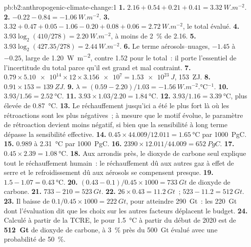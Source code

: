 \begin{solution}{pb:b2:anthropogenic-climate-change:1}
\textbf{1.} $2.16 + 0.54 + 0.21 + 0.41 = \qty{3.32}{W.m^{-2}}$.
\textbf{2.} $-0.22 - 0.84 = \qty{-1.06}{W.m^{-2}}$.
\textbf{3.} $3.32 + 0.47 + 0.05 - 1.06 - 0.20 + 0.08 + 0.06 = \qty{2.72}{W.m^{-2}}$, le total
évalué.
\textbf{4.} $3.93\log_2(410/278) = \qty{2.20}{W.m^{-2}}$, à moins de \qty{2}{\percent} de 2.16.
\textbf{5.} $3.93\log_2(427.35/278) = \qty{2.44}{W.m^{-2}}$.
\textbf{6.} Le terme aérosols--nuages, $-1.45$ à $-0.25$, large de \qty{1.20}{W.m^{-2}}, contre 1.52 pour
le total~: il porte l'essentiel de l'incertitude du total parce qu'il est grand
et mal contraint.
\textbf{7.} $0.79 \times \num{5.10e14} \times 12 \times \num{3.156e7} = \qty{1.53e23}{J}$,
\qty{153}{ZJ}.
\textbf{8.} $0.91 \times 153 = \qty{139}{ZJ}$.
\textbf{9.} $\lambda = (0.59 - 2.20)/1.03 = \qty{-1.56}{W.m^{-2}.\celsius^{-1}}$.
\textbf{10.} $3.93/1.56 = \qty{2.52}{\celsius}$.
\textbf{11.} $3.93 \times 1.03/2.20 = \qty{1.84}{\celsius}$.
\textbf{12.} $3.93/1.16 = \qty{3.39}{\celsius}$, plus élevée de \qty{0.87}{\celsius}.
\textbf{13.} Le réchauffement jusqu'ici a été le plus fort là où les rétroactions sont les plus négatives~; à mesure que le motif évolue,
le paramètre de rétroaction devient moins négatif, si bien que la sensibilité à long terme
dépasse la sensibilité effective.
\textbf{14.} $0.45 \times 44.009/12.011 = \qty{1.65}{\celsius}$ par \qty{1000}{PgC}.
\textbf{15.} 0.989 à \qty{2.31}{\celsius} par \qty{1000}{PgC}.
\textbf{16.} $2390 \times 12.011/44.009 = \qty{652}{PgC}$.
\textbf{17.} $0.45 \times 2.39 = \qty{1.08}{\celsius}$.
\textbf{18.} Aux arrondis près, le dioxyde de carbone seul explique tout le réchauffement humain~:
le réchauffement dû aux autres gaz à effet de serre et le refroidissement dû aux aérosols se compensent presque.
\textbf{19.} $1.5 - 1.07 = \qty{0.43}{\celsius}$.
\textbf{20.} $(0.43 - 0.1)/0.45 \times 1000 = \qty{733}{Gt}$ de dioxyde de carbone.
\textbf{21.} $733 - 210 = \qty{523}{Gt}$.
\textbf{22.} $26 \times 0.43 = \qty{11.2}{Gt}$~; $523 - 11.2 = \qty{512}{Gt}$.
\textbf{23.} Il baisse de $0.1/0.45 \times 1000 = \qty{222}{Gt}$, pour atteindre \qty{290}{Gt}~: les
\qty{220}{Gt} dont l'évaluation dit que les choix sur les autres facteurs déplacent le budget.
\textbf{24.} Calculé à partir de la TCRE, le  pour \qty{1.5}{\celsius} à partir du
début de 2020 est de \textbf{\qty[text-series-to-math=true]{512}{Gt}} de dioxyde de carbone, à \qty{3}{\percent} près
du \qty{500}{Gt} évalué avec une probabilité de \qty{50}{\percent}.
\end{solution}
